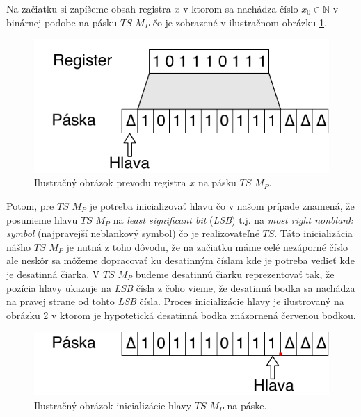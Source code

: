 \documentclass[11pt,a4paper]{article}
\begin{document}
Na začiatku si zapíšeme obsah registra $x$ v ktorom sa nachádza číslo $x_0 \in \mathbb{N}$ v binárnej podobe na pásku $TS$ $M_P$ čo je zobrazené v ilustračnom obrázku \ref{fig:reg_to_tape}.

\begin{figure}[!h]
    \centering
    \includegraphics[scale=1]{img/register_to_tape.pdf}
    \caption{Ilustračný obrázok prevodu registra $x$ na pásku $TS$ $M_P$.}
    \label{fig:reg_to_tape}
\end{figure}

Potom, pre $TS$ $M_P$ je potreba inicializovať hlavu čo v našom prípade znamená, že posunieme hlavu $TS$ $M_P$ na \textit{least significant bit} (\textit{LSB}) t.j. na \textit{most right nonblank symbol} (najpravejší neblankový symbol) čo je realizovateľné $TS$. Táto inicializácia nášho $TS$ $M_P$ je nutná z toho dôvodu, že na začiatku máme celé nezáporné číslo ale neskôr sa môžeme dopracovať ku desatinným číslam kde je potreba vedieť kde je desatinná čiarka. V $TS$ $M_P$ budeme desatinnú čiarku reprezentovať tak, že pozícia hlavy ukazuje na \textit{LSB} čísla z čoho vieme, že desatinná bodka sa nachádza na pravej strane od tohto \textit{LSB} čísla. Proces inicializácie hlavy je ilustrovaný na obrázku \ref{fig:tape_init} v ktorom je hypotetická desatinná bodka znázornená červenou bodkou.\\

\begin{figure}[!h]
    \centering
    \includegraphics[scale=1]{img/tape_head.pdf}
    \caption{Ilustračný obrázok inicializácie hlavy $TS$ $M_P$ na páske.}
    \label{fig:tape_init}
\end{figure}
\end{document}
